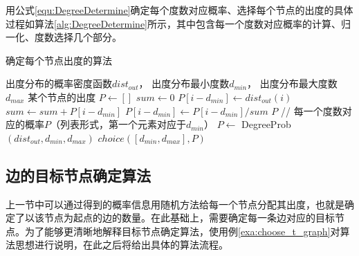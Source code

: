 用公式\ref{equ:DegreeDetermine}确定每个度数对应概率、选择每个节点的出度的具体过程如算法\ref{alg:DegreeDetermine}所示，其中包含每一个度数对应概率的计算、归一化、度数选择几个部分。

% 

\begin{algorithm}[htb]
  \caption{确定每个节点出度的算法}
  \label{alg:DegreeDetermine}
  \begin{algorithmic}[1]
    \Require
      出度分布的概率密度函数$dist_{out}$，
      出度分布最小度数$d_{min}$，
      出度分布最大度数$d_{max}$
    \Ensure 某个节点的出度
      \State $P \gets []$
      \State $sum \gets 0$
        \State $P[i - d_{min}] \gets dist_{out}(i)$
        \State $sum \gets sum + P[i - d_{min}]$
      \EndFor
        \State $P[i - d_{min}] \gets P[i - d_{min}] / sum$
      \EndFor
      \State \Return $P$ // 每一个度数对应的概率$P$（列表形式，第一个元素对应于$d_{min}$）
    \EndFunction
    \State $P \gets$ DegreeProb$(dist_{out}, d_{min}, d_{max})$
      \State \Return $choice([d_{min}, d_{max}], P)$
    \EndFunction
  \end{algorithmic}
\end{algorithm}

\subsection{边的目标节点确定算法}
\label{cha:DetermineTarget}

上一节中可以通过得到的概率信息用随机方法给每一个节点分配其出度，也就是确定了以该节点为起点的边的数量。在此基础上，需要确定每一条边对应的目标节点。为了能够更清晰地解释目标节点确定算法，使用例\ref{exa:choose_t_graph}对算法思想进行说明，在此之后将给出具体的算法流程。

